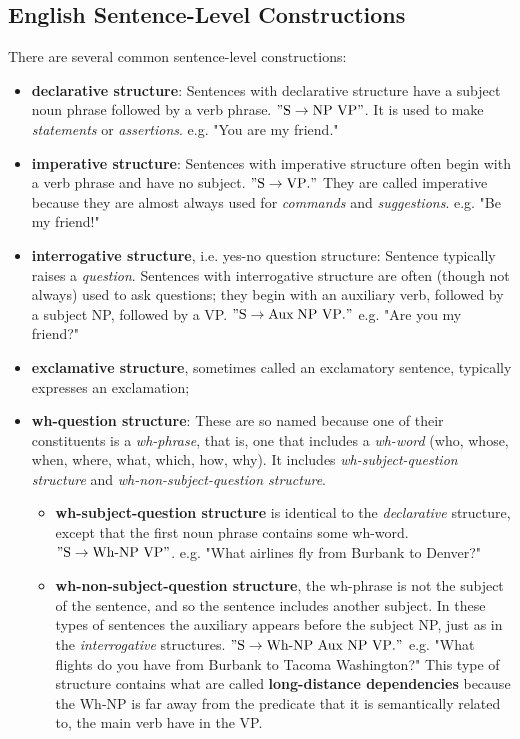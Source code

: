 \documentclass[11pt]{article}
\begin{document}
\subsection{English Sentence-Level Constructions}
There are several common sentence-level constructions:
\begin{itemize}
\item \textbf{declarative structure}:  Sentences with declarative structure have a subject noun phrase followed by a verb phrase. $"\text{S} \rightarrow \text{NP}\,\, \text{VP}"$. It is used to make \emph{statements} or \emph{assertions}. e.g.  "You are my friend."
\item \textbf{imperative structure}: Sentences with imperative structure often begin with a verb phrase and have no subject. $"\text{S} \rightarrow  \text{VP}."$ They are called imperative because they are almost always used for \emph{commands} and \emph{suggestions}.  e.g. "Be my friend!"
\item \textbf{interrogative structure}, i.e. yes-no question structure: Sentence typically raises a \emph{question}. Sentences with interrogative structure are often (though not always) used to
ask questions; they begin with an auxiliary verb, followed by a subject NP, followed by a VP.  $"\text{S} \rightarrow \text{Aux}\;  \text{NP}\,\,\text{VP}."$ e.g. "Are you my friend?"
\item \textbf{exclamative structure}, sometimes called an exclamatory sentence, typically expresses an exclamation;
\item \textbf{wh-question structure}: These are so named because one of their constituents is a \emph{wh-phrase}, that is, one that includes a \emph{wh-word} (who, whose, when, where, what, which, how, why). It includes \emph{wh-subject-question structure} and \emph{wh-non-subject-question structure}.
\begin{itemize}
\item \textbf{wh-subject-question structure} is identical to the \emph{declarative} structure, except that
the first noun phrase contains some wh-word. $"\text{S} \rightarrow \text{Wh-NP}\,\, \text{VP}"$. e.g. "What airlines fly from Burbank to Denver?"
\item \textbf{wh-non-subject-question structure}, the wh-phrase is not the subject of the sentence, and so the sentence includes another subject. In these types of sentences
the auxiliary appears before the subject NP, just as in the \emph{interrogative} structures. $"\text{S} \rightarrow \text{Wh-NP}\,\,\text{Aux}\,\,  \text{NP}\,\,\text{VP}."$ e.g. "What flights do you have from Burbank to Tacoma Washington?" This type of structure contains what are called \textbf{long-distance dependencies}  because the Wh-NP  is far away from the predicate that it is semantically related to, the main verb have in the VP. 
\end{itemize}
\end{itemize}
\end{document}
